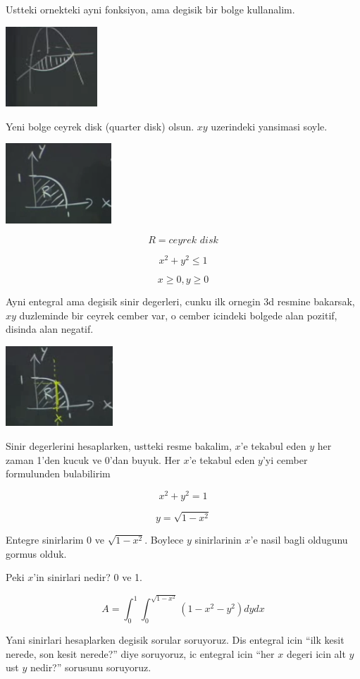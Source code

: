 \documentclass[12pt,fleqn]{article}\usepackage{../common}
\begin{document}
Ustteki ornekteki ayni fonksiyon, ama degisik bir bolge kullanalim. 

\includegraphics[height=3cm]{16_9.png}

Yeni bolge ceyrek disk (quarter disk) olsun. $xy$ uzerindeki yansimasi
soyle. 

\includegraphics[height=3cm]{16_10.png}

\[ R = \textit{ceyrek disk}  \]

\[ x^2 + y^2 \le 1 \]

\[ x \ge 0, y \ge 0 \]

Ayni entegral ama degisik sinir degerleri, cunku ilk ornegin 3d resmine
bakarsak, $xy$ duzleminde bir ceyrek cember var, o cember icindeki bolgede
alan pozitif, disinda alan negatif. 

\includegraphics[height=3cm]{16_11.png}

Sinir degerlerini hesaplarken, ustteki resme bakalim, $x$'e tekabul eden $y$
her zaman 1'den kucuk ve 0'dan buyuk. Her $x$'e tekabul eden $y$'yi cember
formulunden bulabilirim

\[ x^2 + y^2 =1 \]

\[ y = \sqrt{1-x^2} \]

Entegre sinirlarim 0 ve $\sqrt{1-x^2}$. Boylece $y$ sinirlarinin $x$'e
nasil bagli oldugunu gormus olduk. 

Peki $x$'in sinirlari nedir? 0 ve 1. 

\[ A = \int_0^1 \int_0^{\sqrt{1-x^2}}  (1-x^2-y^2) dy dx \]

Yani sinirlari hesaplarken degisik sorular soruyoruz. Dis entegral icin
``ilk kesit nerede, son kesit nerede?'' diye soruyoruz, ic entegral icin
``her $x$ degeri icin alt $y$ ust $y$ nedir?'' sorusunu soruyoruz. 
\end{document}
